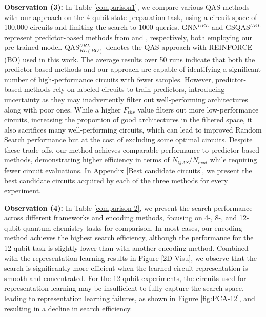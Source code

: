\documentclass{article} %
\begin{document}
\textbf{Observation (3):} In Table \ref{comparison1}, we compare various QAS methods with our approach on the 4-qubit state preparation task, using a circuit space of 100,000 circuits and limiting the search to 1000 queries. GNN$^{URL}$ and GSQAS$^{URL}$ represent predictor-based methods from \citet{he2023gnn} and \citet{he2023gsqas}, respectively, both employing our pre-trained model. QAS$^{URL}_{RL(BO)}$ denotes the QAS approach with REINFORCE (BO) used in this work. The average results over 50 runs indicate that both the predictor-based methods and our approach are capable of identifying a significant number of high-performance circuits with fewer samples.
However, predictor-based methods rely on labeled circuits to train predictors, introducing uncertainty as they may inadvertently filter out well-performing architectures along with poor ones. While a higher $F_{thr}$ value filters out more low-performance circuits, increasing the proportion of good architectures in the filtered space, it also sacrifices many well-performing circuits, which can lead to improved Random Search performance but at the cost of excluding some optimal circuits.
Despite these trade-offs, our method achieves comparable performance to predictor-based methods, demonstrating higher efficiency in terms of $N_{QAS}/N_{eval}$ while requiring fewer circuit evaluations.
In Appendix \ref{Best candidate circuits}, we present the best candidate circuits acquired by each of the three methods for every experiment.

\textbf{Observation (4):} In Table \ref{comparison-2}, we present the search performance across different frameworks and encoding methods, focusing on 4-, 8-, and 12-qubit quantum chemistry tasks for comparison. In most cases, our encoding method achieves the highest search efficiency, although the performance for the 12-qubit task is slightly lower than with another encoding method. Combined with the representation learning results in Figure \ref{2D-Visu}, we observe that the search is significantly more efficient when the learned circuit representation is smooth and concentrated. For the 12-qubit experiments, the circuits used for representation learning may be insufficient to fully capture the search space, leading to representation learning failures, as shown in Figure \ref{fig:PCA-12}, and resulting in a decline in search efficiency.
\end{document}
